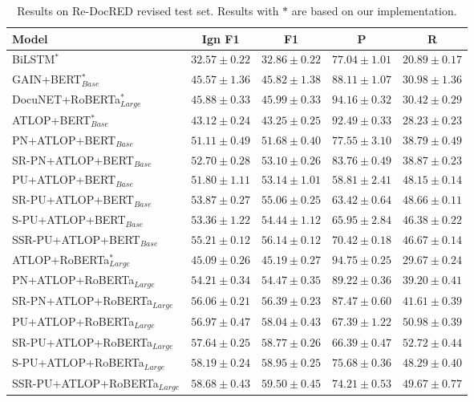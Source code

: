 \documentclass[11pt]{article}
\begin{document}
\begin{table*}
\centering
\begin{tabular}{lcccc}
\hline \textbf{Model} & \textbf{Ign F1} & \textbf{F1} & \textbf{P} & \textbf{R} \\
\hline BiLSTM$^{\ast}$ & $32.57 \pm 0.22$ & $32.86 \pm 0.22$ & $77.04 \pm 1.01$ & $20.89 \pm 0.17$ \\
GAIN+BERT$_{Base}^{\ast}$ & $45.57 \pm 1.36$ & $45.82 \pm 1.38$ & $88.11 \pm 1.07$ & $30.98 \pm 1.36$ \\
DocuNET+RoBERTa$_{Large}^{\ast}$ & $45.88 \pm 0.33$ & $45.99 \pm 0.33$ & $94.16 \pm 0.32$ & $30.42 \pm 0.29$ \\
\hline
\hline ATLOP+BERT$_{Base}^{\ast}$ & $43.12 \pm 0.24$ & $43.25 \pm 0.25$ & $\mathbf{92.49} \pm \mathbf{0.33}$ & $28.23 \pm 0.23$ \\
PN+ATLOP+BERT$_{Base}$ & $51.11 \pm 0.49$ & $51.68 \pm 0.40$ & $77.55 \pm 3.10$ & $38.79 \pm 0.49$ \\
SR-PN+ATLOP+BERT$_{Base}$ & $52.70 \pm 0.28$ & $53.10 \pm 0.26$ & $83.76 \pm 0.49$ & $38.87 \pm 0.23$ \\
PU+ATLOP+BERT$_{Base}$ & $51.80 \pm 1.11$ & $53.14 \pm 1.01$ & $58.81 \pm 2.41$ & $48.15 \pm 0.14$ \\
SR-PU+ATLOP+BERT$_{Base}$ & $53.87 \pm 0.27$ & $55.06 \pm 0.25$ & $63.42 \pm 0.64$ & $\mathbf{48.66} \pm \mathbf{0.11}$ \\
S-PU+ATLOP+BERT$_{Base}$ & $53.36 \pm 1.22$ & $54.44 \pm 1.12$ & $65.95 \pm 2.84$ & $46.38 \pm 0.22$ \\
SSR-PU+ATLOP+BERT$_{Base}$ & $\mathbf{55.21} \pm \mathbf{0.12}$ & $\mathbf{56.14} \pm \mathbf{0.12}$ & $70.42 \pm 0.18$ & $46.67 \pm 0.14$ \\
\hline ATLOP+RoBERTa$_{Large}^{\ast}$ & $45.09 \pm 0.26$ & $45.19 \pm 0.27$ & $\mathbf{94.75} \pm \mathbf{0.25}$ & $29.67 \pm 0.24$ \\
PN+ATLOP+RoBERTa$_{Large}$ & $54.21 \pm 0.34$ & $54.47 \pm 0.35$ & $89.22 \pm 0.36$ & $39.20 \pm 0.41$ \\
SR-PN+ATLOP+RoBERTa$_{Large}$ & $56.06 \pm 0.21$ & $56.39 \pm 0.23$ & $87.47 \pm 0.60$ & $41.61 \pm 0.39$ \\
PU+ATLOP+RoBERTa$_{Large}$ & $56.97 \pm 0.47$ & $58.04 \pm 0.43$ & $67.39 \pm 1.22$ & $50.98 \pm 0.39$ \\
SR-PU+ATLOP+RoBERTa$_{Large}$ & $57.64 \pm 0.25$ & $58.77 \pm 0.26$ & $66.39 \pm 0.47$ & $\mathbf{52.72} \pm \mathbf{0.44}$ \\
S-PU+ATLOP+RoBERTa$_{Large}$ & $58.19 \pm 0.24$ & $58.95 \pm 0.25$ & $75.68 \pm 0.36$ & $48.29 \pm 0.40$ \\
SSR-PU+ATLOP+RoBERTa$_{Large}$ & $\mathbf{58.68} \pm \mathbf{0.43}$ & $\mathbf{59.50} \pm \mathbf{0.45}$ & $74.21 \pm 0.53$ & $49.67 \pm 0.77$ \\
\hline
\end{tabular}
\caption{\label{table1}
Results on Re-DocRED revised test set. Results with $\ast$ are based on our implementation.
}
\end{table*}
\end{document}
